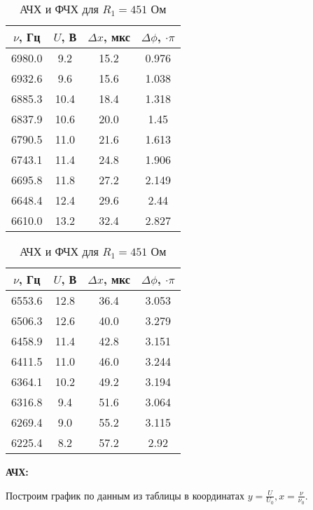 \documentclass[a4paper,12pt]{article} %
\begin{document}
\begin{enumerate}
    \begin{table}[h]
		\centering
		\begin{tabular}{|c|c|c|c|}
			\hline
			$\nu$, Гц & $U$, В & $\Delta x$, мкс & $\Delta \phi$, $\cdot \pi$ \\ \hline
			6980.0 & 9.2 & 15.2 & 0.976 \\ \hline
                6932.6 & 9.6 & 15.6 & 1.038 \\ \hline
                6885.3 & 10.4 & 18.4 & 1.318 \\ \hline
                6837.9 & 10.6 & 20.0 & 1.45 \\ \hline
                6790.5 & 11.0 & 21.6 & 1.613 \\ \hline
                6743.1 & 11.4 & 24.8 & 1.906 \\ \hline
                6695.8 & 11.8 & 27.2 & 2.149 \\ \hline
                6648.4 & 12.4 & 29.6 & 2.44 \\ \hline
                6610.0 & 13.2 & 32.4 & 2.827 \\ \hline
		\end{tabular}
		\hspace{.06\textwidth}
		\begin{tabular}{|c|c|c|c|}
			\hline
			$\nu$, Гц & $U$, В & $\Delta x$, мкс & $\Delta \phi$, $\cdot \pi$ \\ \hline
			6553.6 & 12.8 & 36.4 & 3.053 \\ \hline
                6506.3 & 12.6 & 40.0 & 3.279 \\ \hline
                6458.9 & 11.4 & 42.8 & 3.151 \\ \hline
                6411.5 & 11.0 & 46.0 & 3.244 \\ \hline
                6364.1 & 10.2 & 49.2 & 3.194 \\ \hline
                6316.8 & 9.4 & 51.6 & 3.064 \\ \hline
                6269.4 & 9.0 & 55.2 & 3.115 \\ \hline
                6225.4 & 8.2 & 57.2 & 2.92 \\ \hline
		\end{tabular}
		\caption{АЧХ и ФЧХ для $R_1 = 451$ Ом}
		
	\end{table}

    \textbf{АЧХ:}

    Построим график по данным из таблицы в координатах  $ y = \frac{U}{U_{0}}, x = \frac{\nu}{\nu_0}$. 
    

\end{enumerate}
\end{document}
